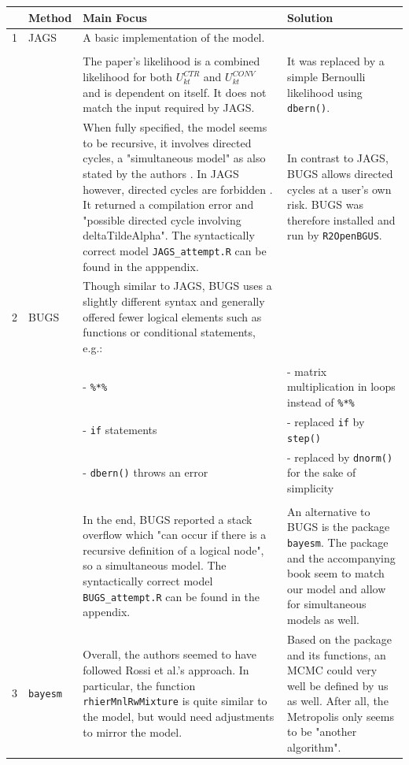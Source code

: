 \begin{longtable}{| p{0.2cm} | p{1.5cm} | p{4.5cm} | p{4.5cm} |}
    \hline
    &\textbf{Method} & \textbf{Main Focus} & \textbf{Solution}\\
    \hline \hline
    1 & JAGS & A basic implementation of the model. &\\
    &&&\\
    && The paper's likelihood is a combined likelihood for both $U^{CTR}_{kt}$ and $U^{CONV}_{kt}$ and is dependent on itself. It does not match the input required by JAGS. & It was replaced by a simple Bernoulli likelihood using \texttt{dbern()}.\\
    & & When fully specified, the model seems to be recursive, it involves directed cycles, a "simultaneous model" as also stated by the authors \citep[p. 19]{agarwal_organic_2015}. In JAGS however, directed cycles are forbidden \citep[p. 15]{JAGS}. It returned a compilation error and "possible directed cycle involving deltaTildeAlpha". The syntactically correct model \texttt{JAGS\_attempt.R} can be found in the apppendix.
    & In contrast to JAGS, BUGS allows directed cycles at a user's own risk. BUGS was therefore installed and run by \texttt{R2OpenBGUS}.\\
    \hline
    2 & BUGS & Though similar to JAGS, BUGS uses a slightly different syntax and generally offered fewer logical elements such as functions or conditional statements, e.g.: &\\
    &&&\\
    && - \texttt{\%*\%} & - matrix multiplication in loops instead of \texttt{\%*\%}\\
    && - \texttt{if} statements & - replaced \texttt{if} by \texttt{step()}\\
    && - \texttt{dbern()} throws an error & - replaced by \texttt{dnorm()} for the sake of simplicity\\
    && &\\
    \hline
    && In the end, BUGS reported a stack overflow which "can occur if there is a recursive definition of a logical node", so a simultaneous model. The syntactically correct model \texttt{BUGS\_attempt.R} can be found in the appendix. & An alternative to BUGS is the package \texttt{bayesm}. The package and the accompanying book \citep{rossibook} seem to match our model and allow for simultaneous models as well. \\
    \hline
    3 & \texttt{bayesm} & Overall, the authors seemed to have followed Rossi et al.'s approach. In particular, the function \texttt{rhierMnlRwMixture} is quite similar to the model, but would need adjustments to mirror the model. & Based on the package and its functions, an MCMC could very well be defined by us as well. After all, the Metropolis only seems to be "another algorithm".\\

\end{longtable}
